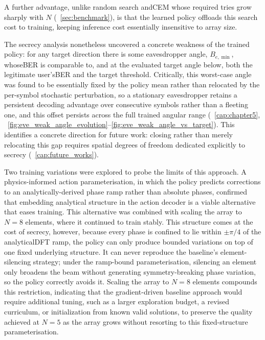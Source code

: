 A further advantage, unlike random search and\gls{CEM} whose required tries grow sharply with $N$ (\sectionname~\ref{sec:benchmark}), is that the learned policy offloads this search cost to training, keeping inference cost essentially insensitive to array size.

The secrecy analysis nonetheless uncovered a concrete weakness of the trained policy: for any target direction there is some eavesdropper angle, $B_{e,\min}$, whose\gls{BER} is comparable to, and at the evaluated target angle below, both the legitimate user's\gls{BER} and the target threshold. Critically, this worst-case angle was found to be essentially fixed by the policy mean rather than relocated by the per-symbol stochastic perturbation, so a stationary eavesdropper retains a persistent decoding advantage over consecutive symbols rather than a fleeting one, and this offset persists across the full trained angular range (\chaptername~\ref{cap:chapter5}, \figurename~\ref{fig:eve_weak_angle_evolution}--\ref{fig:eve_weak_angle_vs_target}). This identifies a concrete direction for future work: closing rather than merely relocating this gap requires spatial degrees of freedom dedicated explicitly to secrecy (\sectionname~\ref{cap:future_works}).

Two training variations were explored to probe the limits of this approach. A physics-informed action parameterisation, in which the policy predicts corrections to an analytically-derived phase ramp rather than absolute phases, confirmed that embedding analytical structure in the action decoder is a viable alternative that eases training. This alternative was combined with scaling the array to $N=8$ elements, where it continued to train stably. This structure comes at the cost of secrecy, however, because every phase is confined to lie within $\pm\pi/4$ of the analytical\gls{DFT} ramp, the policy can only produce bounded variations on top of one fixed underlying structure. It can never reproduce the baseline's element-silencing strategy; under the ramp-bound parameterisation, silencing an element only broadens the beam without generating symmetry-breaking phase variation, so the policy correctly avoids it. Scaling the array to $N=8$ elements compounds this restriction, indicating that the gradient-driven baseline approach would require additional tuning, such as a larger exploration budget, a revised curriculum, or initialization from known valid solutions, to preserve the quality achieved at $N=5$ as the array grows without resorting to this fixed-structure parameterisation.

